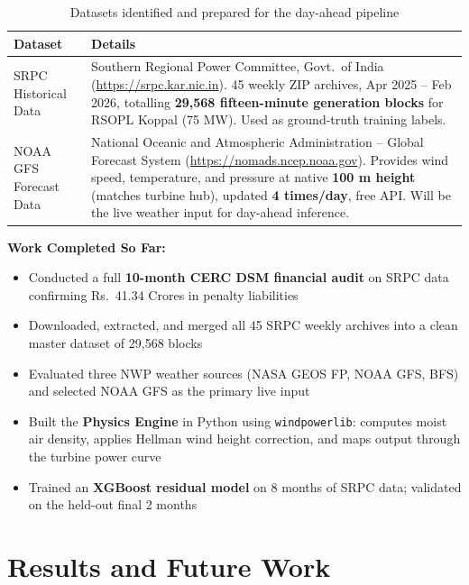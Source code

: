 \documentclass[11pt,a4paper]{article}
\begin{document}
\begin{table}[h!]
\centering
\small
\begin{tabular}{@{} p{3.5cm} p{9.7cm} @{}}
    \toprule
    \textbf{Dataset} & \textbf{Details} \\
    \midrule
    SRPC Historical Data &
        Southern Regional Power Committee, Govt.\ of India
        (\url{https://srpc.kar.nic.in}).
        45 weekly ZIP archives, Apr 2025 -- Feb 2026,
        totalling \textbf{29,568 fifteen-minute generation blocks} for
        RSOPL Koppal (75 MW). Used as ground-truth training labels. \\[4pt]
    NOAA GFS Forecast Data &
        National Oceanic and Atmospheric Administration -- Global Forecast
        System (\url{https://nomads.ncep.noaa.gov}).
        Provides wind speed, temperature, and pressure at native
        \textbf{100 m height} (matches turbine hub), updated \textbf{4 times/day},
        free API. Will be the live weather input for day-ahead inference. \\
    \bottomrule
\end{tabular}
\caption{Datasets identified and prepared for the day-ahead pipeline}
\end{table}

\textbf{Work Completed So Far:}
\begin{itemize}
    \item Conducted a full \textbf{10-month CERC DSM financial audit} on SRPC data confirming Rs.\ 41.34 Crores in penalty liabilities
    \item Downloaded, extracted, and merged all 45 SRPC weekly archives into a clean master dataset of 29,568 blocks
    \item Evaluated three NWP weather sources (NASA GEOS FP, NOAA GFS, BFS) and selected NOAA GFS as the primary live input
    \item Built the \textbf{Physics Engine} in Python using \texttt{windpowerlib}: computes moist air density, applies Hellman wind height correction, and maps output through the turbine power curve
    \item Trained an \textbf{XGBoost residual model} on 8 months of SRPC data; validated on the held-out final 2 months
\end{itemize}

\section{Results and Future Work}
\end{document}
